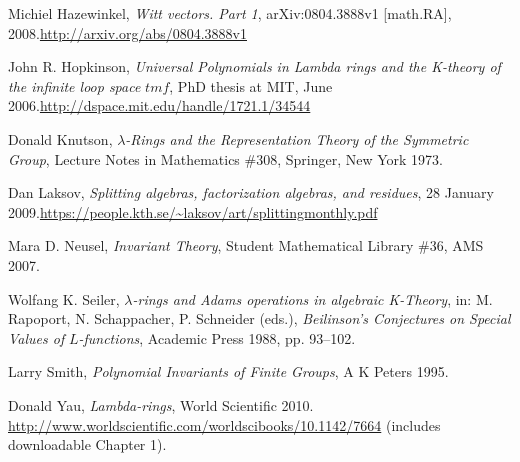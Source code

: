 \documentclass[numbers=enddot,12pt,final,onecolumn,notitlepage]{scrartcl}%
\begin{document}
\begin{thebibliography}{999999999}
Michiel Hazewinkel, \textit{Witt vectors. Part
1}, arXiv:0804.3888v1 [math.RA], 2008.\newline\url{http://arxiv.org/abs/0804.3888v1}

John R. Hopkinson, \textit{Universal Polynomials
in Lambda rings and the K-theory of the infinite loop space }$tmf$, PhD thesis
at MIT, June 2006.\newline\url{http://dspace.mit.edu/handle/1721.1/34544}

Donald Knutson, $\lambda$\textit{-Rings and the
Representation Theory of the Symmetric Group}, Lecture Notes in Mathematics
\#308, Springer, New York 1973.

Dan Laksov, \textit{Splitting algebras,
factorization algebras, and residues}, 28 January 2009.\newline\url{https://people.kth.se/~laksov/art/splittingmonthly.pdf}

Mara D. Neusel, \textit{Invariant Theory}, Student
Mathematical Library \#36, AMS 2007.

Wolfang K. Seiler, $\lambda$\textit{-rings and
Adams operations in algebraic K-Theory}, in: M. Rapoport, N. Schappacher, P.
Schneider (eds.), \textit{Beilinson's Conjectures on Special Values of }%
$L$\textit{-functions}, Academic Press 1988, pp. 93--102.

Larry Smith, \textit{Polynomial Invariants of Finite
Groups}, A K Peters 1995.

Donald Yau, \textit{Lambda-rings}, World Scientific
2010.\newline%
\url{http://www.worldscientific.com/worldscibooks/10.1142/7664}\newline%
(includes downloadable Chapter 1).
\end{thebibliography}
\end{document}
